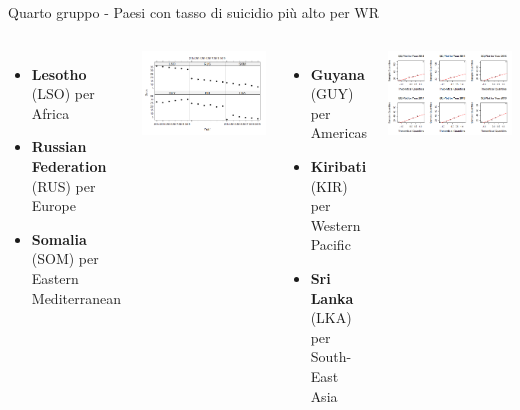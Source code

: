 \documentclass{beamer}
\begin{document}
\begin{frame}{Quarto gruppo - Paesi con tasso di suicidio più alto per WR}
	\begin{columns}
			\begin{itemize}
				\item \textbf{Lesotho} (LSO) per Africa
				\item \textbf{Russian Federation} (RUS) per Europe
				\item \textbf{Somalia} (SOM) per Eastern Mediterranean
			\end{itemize}
			\bigskip
			\includegraphics[width=\linewidth]{Images/11 - Fourthgroup.png}
			\begin{itemize}
				\item \textbf{Guyana} (GUY) per Americas
				\item \textbf{Kiribati} (KIR) per Western Pacific
				\item \textbf{Sri Lanka} (LKA) per South-East Asia
			\end{itemize}
			\bigskip
			\includegraphics[width=\linewidth]{Images/12 - Fourthqq.png}
	\end{columns}
\end{frame}
\end{document}
